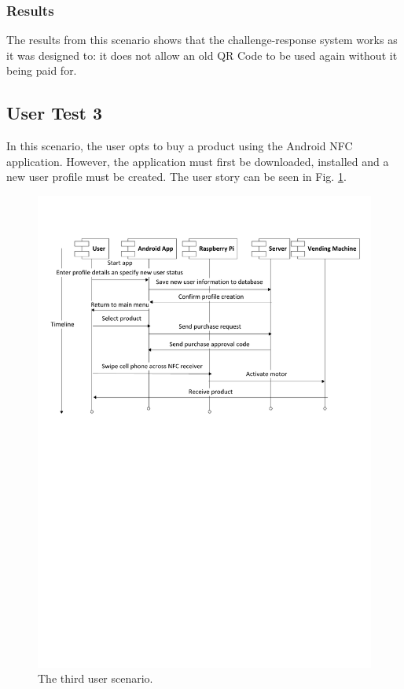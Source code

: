 \subsubsection{Results}

The results from this scenario shows that the challenge-response system works as it was
designed to: it does not allow an old QR Code to be used again without it being paid for. 

\subsection{User Test 3}

In this scenario, the user opts to buy a product using the Android NFC
application. However, the application must first be downloaded, installed and a
new user profile must be created. The user story can be seen in Fig.
\ref{fig:test3}.

\begin{figure}
 \centering 
 \includegraphics[clip=true, trim = 0 450 0 70,
 scale=0.7]{user_story_3}
 \caption{The third user scenario.}
 \label{fig:test3}
\end{figure}


